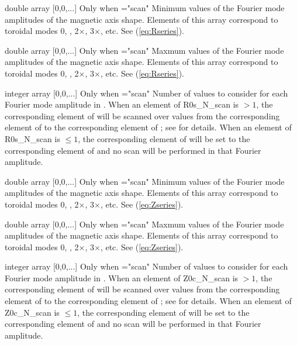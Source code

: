 \myhrule

{double array}
{[0,0,...]}
{Only when ={\ttfamily "scan"}}
{Minimum values of the Fourier mode amplitudes of the magnetic axis shape. Elements of this array correspond to toroidal modes 0, , 2$\times$, 3$\times$, etc.  See (\ref{eq:Rseries}).
}

\myhrule

{double array}
{[0,0,...]}
{Only when ={\ttfamily "scan"}}
{Maxmum values of the Fourier mode amplitudes of the magnetic axis shape. Elements of this array correspond to toroidal modes 0, , 2$\times$, 3$\times$, etc.  See (\ref{eq:Rseries}).
}

\myhrule

{integer array}
{[0,0,...]}
{Only when ={\ttfamily "scan"}}
{Number of values to consider for each Fourier mode amplitude in . When an element of {\ttfamily R0s\_N\_scan} is $>1$, the corresponding element of  will be scanned over  values from the corresponding element of  to the corresponding element of ; see  for details.  When an element of {\ttfamily R0s\_N\_scan} is $\le 1$, the corresponding element of  will be set to the corresponding element of  and no scan will be performed in that Fourier amplitude.
}

\myhrule

{double array}
{[0,0,...]}
{Only when ={\ttfamily "scan"}}
{Minimum values of the Fourier mode amplitudes of the magnetic axis shape. Elements of this array correspond to toroidal modes 0, , 2$\times$, 3$\times$, etc.  See (\ref{eq:Zseries}).
}

\myhrule

{double array}
{[0,0,...]}
{Only when ={\ttfamily "scan"}}
{Maxmum values of the Fourier mode amplitudes of the magnetic axis shape. Elements of this array correspond to toroidal modes 0, , 2$\times$, 3$\times$, etc.  See (\ref{eq:Zseries}).
}

\myhrule

{integer array}
{[0,0,...]}
{Only when ={\ttfamily "scan"}}
{Number of values to consider for each Fourier mode amplitude in . When an element of {\ttfamily Z0c\_N\_scan} is $>1$, the corresponding element of  will be scanned over  values from the corresponding element of  to the corresponding element of ; see  for details.  When an element of {\ttfamily Z0c\_N\_scan} is $\le 1$, the corresponding element of  will be set to the corresponding element of  and no scan will be performed in that Fourier amplitude.
}

